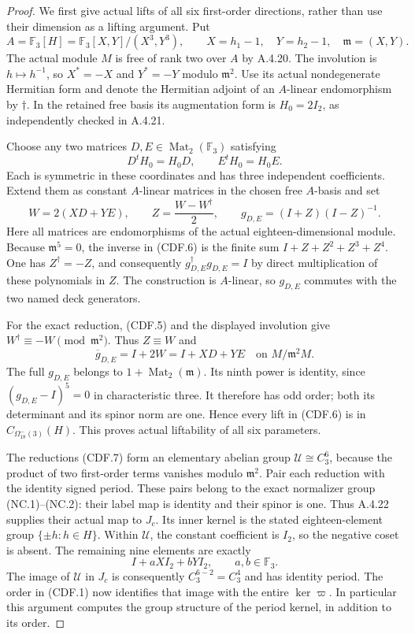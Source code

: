 \begin{proof}
We first give actual lifts of all six first-order
directions, rather than use their dimension as a lifting
argument. Put
\[
 A=\mathbb F_3[H]
   =\mathbb F_3[X,Y]/(X^3,Y^3),\qquad
 X=h_1-1,\quad Y=h_2-1,\quad\mathfrak m=(X,Y).
 \tag{CDF.4}
\]
The actual module $M$ is free of rank two over $A$ by
A.4.20. The involution is $h\mapsto h^{-1}$, so
$X^*=-X$ and $Y^*=-Y$ modulo $\mathfrak m^2$.
Use its actual nondegenerate Hermitian form and denote
the Hermitian adjoint of an $A$-linear endomorphism by
$\dagger$. In the retained free basis its augmentation
form is $H_0=2I_2$, as independently checked in A.4.21.

Choose any two matrices $D,E\in\operatorname{Mat}_2(\mathbb F_3)$
satisfying
\[
 D^tH_0=H_0D,\qquad E^tH_0=H_0E.
 \tag{CDF.5}
\]
Each is symmetric in these coordinates and has three
independent coefficients. Extend them as constant
$A$-linear matrices in the chosen free $A$-basis and set
\[
 W=2(XD+YE),\qquad
 Z=\frac{W-W^\dagger}{2},\qquad
 g_{D,E}=(I+Z)(I-Z)^{-1}.
 \tag{CDF.6}
\]
Here all matrices are endomorphisms of the actual
eighteen-dimensional module. Because
$\mathfrak m^5=0$, the inverse in (CDF.6) is the
finite sum $I+Z+Z^2+Z^3+Z^4$.
One has $Z^\dagger=-Z$, and consequently
$g_{D,E}^\dagger g_{D,E}=I$ by direct multiplication
of these polynomials in $Z$.
The construction is $A$-linear, so $g_{D,E}$ commutes
with the two named deck generators.

For the exact reduction, (CDF.5) and the displayed
involution give $W^\dagger\equiv-W\pmod{\mathfrak m^2}$.
Thus $Z\equiv W$ and
\[
 \overline g_{D,E}
       =I+2W=I+XD+YE
             \quad\text{on }M/\mathfrak m^2M.
 \tag{CDF.7}
\]
The full $g_{D,E}$ belongs to
$1+\operatorname{Mat}_2(\mathfrak m)$.
Its ninth power is identity, since
$(g_{D,E}-I)^5=0$ in characteristic three.
It therefore has odd order; both its determinant
and its spinor norm are one. Hence every lift in
(CDF.6) is in $C_{\Omega^-_{18}(3)}(H)$.
This proves actual liftability of all six parameters.

The reductions (CDF.7) form an elementary abelian
group $\mathcal U\cong C_3^6$, because the product
of two first-order terms vanishes modulo
$\mathfrak m^2$. Pair each reduction with the
identity signed period. These pairs belong to the
exact normalizer group (NC.1)--(NC.2): their label
map is identity and their spinor is one.
Thus A.4.22 supplies their actual map to $J_c$.
Its inner kernel is the stated eighteen-element
group $\{\pm h:h\in H\}$. Within $\mathcal U$,
the constant coefficient is $I_2$, so the negative
coset is absent. The remaining nine elements are
exactly
\[
 I+aXI_2+bYI_2,\qquad a,b\in\mathbb F_3.
 \tag{CDF.8}
\]
The image of $\mathcal U$ in $J_c$ is consequently
$C_3^{6-2}=C_3^4$ and has identity period.
The order in (CDF.1) now identifies that image
with the entire $\ker\varpi$.
In particular this argument computes the group
structure of the period kernel, in addition to
its order.


\end{proof}
